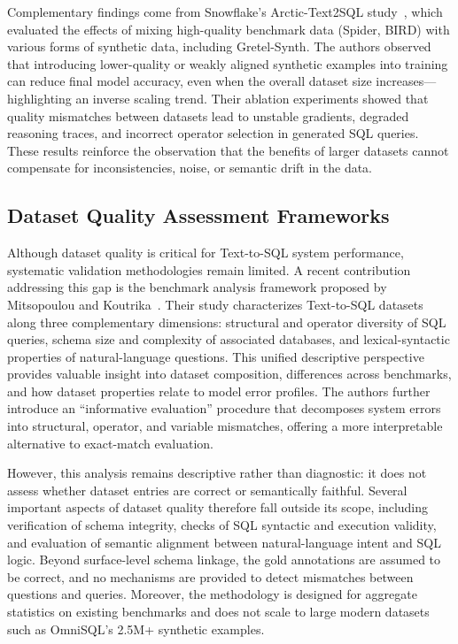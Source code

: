 \documentclass[print]{einformatica}
\begin{document}
Complementary findings come from Snowflake's Arctic-Text2SQL study~\cite{yao2025arctic}, which evaluated the effects of mixing high-quality benchmark data (Spider, BIRD) with various forms of synthetic data, including Gretel-Synth. The authors observed that introducing lower-quality or weakly aligned synthetic examples into training can reduce final model accuracy, even when the overall dataset size increases---highlighting an inverse scaling trend. Their ablation experiments showed that quality mismatches between datasets lead to unstable gradients, degraded reasoning traces, and incorrect operator selection in generated SQL queries. These results reinforce the observation that the benefits of larger datasets cannot compensate for inconsistencies, noise, or semantic drift in the data.

\subsection{Dataset Quality Assessment Frameworks}\label{sec:dataset_quality}

Although dataset quality is critical for Text-to-SQL system performance, systematic validation methodologies remain limited. A recent contribution addressing this gap is the benchmark analysis framework proposed by Mitsopoulou and Koutrika~\cite{mitsopoulou2025analysis}. Their study characterizes Text-to-SQL datasets along three complementary dimensions: structural and operator diversity of SQL queries, schema size and complexity of associated databases, and lexical-syntactic properties of natural-language questions. This unified descriptive perspective provides valuable insight into dataset composition, differences across benchmarks, and how dataset properties relate to model error profiles. The authors further introduce an ``informative evaluation'' procedure that decomposes system errors into structural, operator, and variable mismatches, offering a more interpretable alternative to exact-match evaluation.

However, this analysis remains descriptive rather than diagnostic: it does not assess whether dataset entries are correct or semantically faithful. Several important aspects of dataset quality therefore fall outside its scope, including verification of schema integrity, checks of SQL syntactic and execution validity, and evaluation of semantic alignment between natural-language intent and SQL logic. Beyond surface-level schema linkage, the gold annotations are assumed to be correct, and no mechanisms are provided to detect mismatches between questions and queries. Moreover, the methodology is designed for aggregate statistics on existing benchmarks and does not scale to large modern datasets such as OmniSQL's 2.5M+ synthetic examples.
\end{document}
